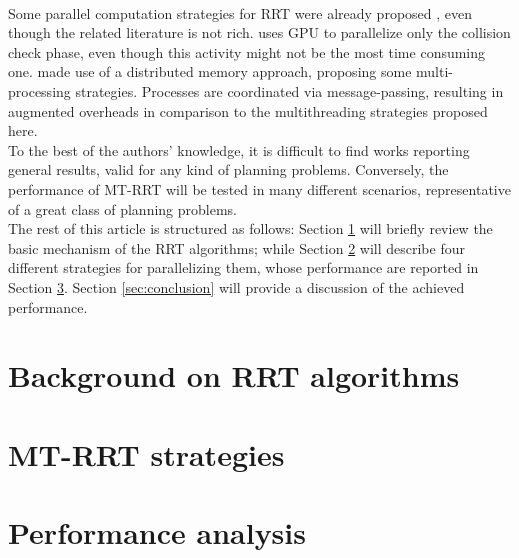 \documentclass[letterpaper, 10 pt, conference]{ieeeconf}  %
\begin{document}
\\
Some parallel computation strategies for RRT were already proposed \cite{Planning_parall_review}, even though the related literature is not rich.
\cite{RRT_GPU} uses GPU to parallelize only the collision check phase, even though this activity might not be the most time consuming one. 
\cite{RRT_MPI} made use of a distributed memory approach, proposing some multi-processing strategies. Processes are coordinated via message-passing, resulting in augmented overheads in comparison to the multithreading strategies proposed here.  
\\
To the best of the authors' knowledge, it is difficult to find works reporting general results, valid for any kind of planning problems. Conversely, the performance of MT-RRT will be tested in many different scenarios, representative of a great class of planning problems.
\\
The rest of this article is structured as follows:
Section \ref{sec:cap_02} will briefly review the basic mechanism of the RRT algorithms; while Section \ref{sec:cap_03} will describe four different strategies for parallelizing them, whose performance are reported in Section \ref{sec:cap_04}.
Section \ref{sec:conclusion} will provide a discussion of the achieved performance.




\section{Background on RRT algorithms}
\label{sec:cap_02}


\section{MT-RRT strategies}
\label{sec:cap_03}


%


\section{Performance analysis}
\label{sec:cap_04}

\end{document}
